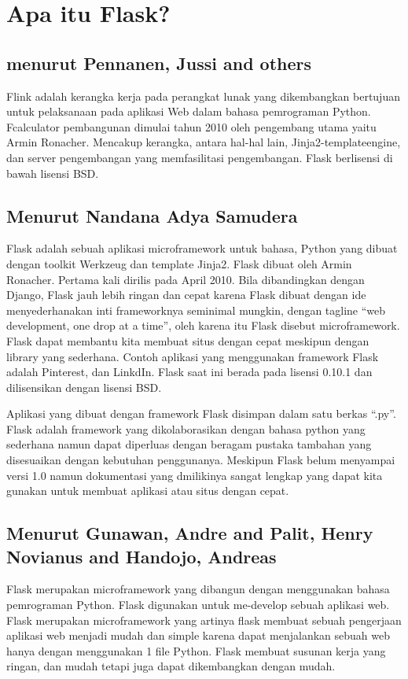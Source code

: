 \documentclass[12pt]{article}
\begin{document}
\section{Apa itu Flask?}
\subsection{menurut Pennanen, Jussi and others}
Flink adalah kerangka kerja pada perangkat lunak yang dikembangkan bertujuan untuk pelaksanaan pada aplikasi Web dalam bahasa pemrograman Python. Fcalculator pembangunan dimulai tahun 2010 oleh pengembang utama yaitu Armin Ronacher. Mencakup kerangka, antara hal-hal lain, Jinja2-templateengine, dan server pengembangan yang memfasilitasi pengembangan. Flask berlisensi di bawah lisensi BSD\cite{pennanen2018sovellus}.

\subsection{Menurut Nandana Adya Samudera}
Flask adalah sebuah aplikasi microframework untuk bahasa, Python yang dibuat dengan toolkit Werkzeug dan template Jinja2. Flask dibuat oleh Armin Ronacher. Pertama kali dirilis pada April 2010. Bila dibandingkan dengan Django, Flask jauh lebih ringan dan cepat karena Flask dibuat dengan ide menyederhanakan inti frameworknya seminimal mungkin, dengan tagline “web development, one drop at a time”, oleh karena itu Flask disebut microframework. Flask dapat membantu kita membuat situs dengan cepat meskipun dengan library yang sederhana. Contoh aplikasi yang menggunakan framework Flask adalah Pinterest, dan LinkdIn. Flask saat ini berada pada lisensi 0.10.1 dan dilisensikan dengan lisensi BSD.

Aplikasi yang dibuat dengan framework Flask disimpan dalam satu berkas “.py”. Flask adalah framework yang dikolaborasikan dengan bahasa python yang sederhana namun dapat diperluas dengan beragam pustaka tambahan yang disesuaikan dengan kebutuhan penggunanya. Meskipun Flask belum menyampai versi 1.0 namun dokumentasi yang dmilikinya sangat lengkap yang dapat kita gunakan untuk membuat aplikasi atau situs dengan cepat\cite{samudera2015perancangan}.

\subsection{Menurut Gunawan, Andre and Palit, Henry Novianus and Handojo, Andreas}
Flask merupakan microframework yang dibangun dengan menggunakan bahasa pemrograman Python. Flask digunakan untuk me-develop sebuah aplikasi web. Flask merupakan microframework yang artinya flask membuat sebuah pengerjaan aplikasi web menjadi mudah dan simple karena dapat menjalankan sebuah web hanya dengan menggunakan 1 file Python. Flask membuat susunan kerja yang ringan, dan mudah tetapi juga dapat dikembangkan dengan mudah\cite{gunawan2018aplikasi}.
\end{document}
